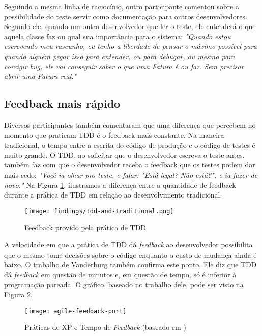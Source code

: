 Seguindo a mesma linha de raciocínio, outro participante comentou sobre a possibilidade
do teste servir como documentação para outros desenvolvedores. Segundo ele, quando um outro desenvolvedor
que ler o teste, ele entenderá o que aquela classe faz ou qual sua importância para o sistema:
\textit{"Quando estou escrevendo meu rascunho, eu tenho a liberdade de pensar o máximo possível para quando alguém
pegar isso para entender, ou para debugar, ou mesmo para corrigir bug, ele vai conseguir saber o que uma Fatura é ou faz. Sem
precisar abrir uma Fatura real."}

\subsection{Feedback mais rápido}

Diversos participantes também comentaram que uma diferença que percebem
no momento que praticam TDD é o feedback mais constante. Na maneira
tradicional, o tempo entre a escrita do código de produção e o código
de testes é muito grande. O TDD, ao solicitar que o desenvolvedor
escreva o teste antes, também faz com que o desenvolvedor receba o feedback que
os testes podem dar mais cedo:
\textit{"Você ia olhar pro teste, e falar: "Está legal? Não está?", e ia fazer de novo."}
Na Figura \ref{fig:tdd-feedback}, ilustramos
a diferença entre a quantidade de feedback durante a prática de TDD em relação
ao desenvolvimento tradicional.

\begin{figure}[h!H]
  \centering
  \texttt{[image: findings/tdd-and-traditional.png]}
  \caption{Feedback provido pela prática de TDD}
  \label{fig:tdd-feedback}
\end{figure}

A velocidade em que a prática de TDD dá \textit{feedback} ao desenvolvedor possibilita que o mesmo
tome decisões sobre o código enquanto o custo de mudança ainda é
baixo. O trabalho de Vanderburg \cite{vanderburg} também confirma este ponto.
Ele diz que TDD dá \textit{feedback} em questão de
minutos e, em questão de tempo, só é inferior à programação pareada. O gráfico,
baseado no trabalho dele, pode ser visto na Figura
\ref{fig:agile-feedback}.

\begin{figure}
  \centering
  \texttt{[image: agile-feedback-port]}
  \caption{Práticas de XP e Tempo de \textit{Feedback} (baseado em \cite{vanderburg})}
  \label{fig:agile-feedback}
\end{figure}

